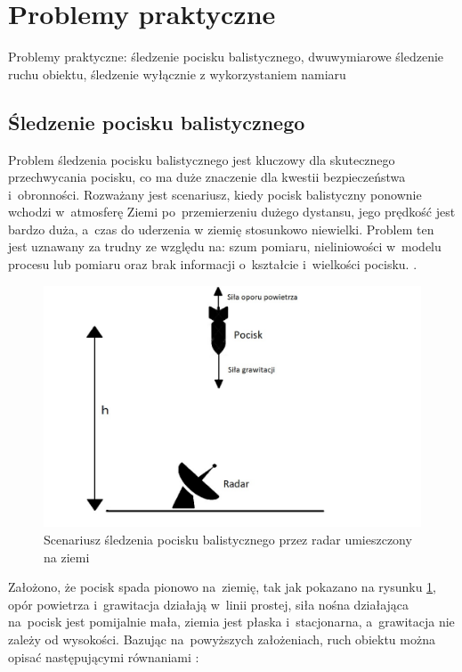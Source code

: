 \section{Problemy praktyczne}
\label{sec:practical_problems}
Problemy praktyczne:  śledzenie pocisku balistycznego, dwuwymiarowe śledzenie ruchu obiektu, śledzenie wyłącznie z wykorzystaniem namiaru 
\subsection{Śledzenie pocisku balistycznego}
\label{subsec:ballistic_target_tracking}
Problem śledzenia pocisku balistycznego jest kluczowy dla skutecznego przechwycania pocisku, co ma duże znaczenie dla kwestii bezpieczeństwa i~obronności. Rozważany jest scenariusz, kiedy pocisk balistyczny ponownie wchodzi w~atmosferę Ziemi po~przemierzeniu dużego dystansu, jego prędkość jest bardzo duża, a~czas do uderzenia w ziemię stosunkowo niewielki. Problem ten jest uznawany za trudny ze względu na: szum pomiaru, nieliniowości w~modelu procesu lub pomiaru oraz brak informacji o~kształcie i~wielkości pocisku. \cite{MisslieTracking1}\cite{MissileTracking2}.
\begin{figure}[h!]
	\centering
	\includegraphics[width=0.8\linewidth]{missile_tracking_illustration.jpg}
	\caption{Scenariusz śledzenia pocisku balistycznego przez radar umieszczony na ziemi}
	\label{fig:missile_tracking_illustration}
\end{figure}
\par
Założono, że pocisk spada pionowo na~ziemię, tak jak pokazano na rysunku \ref{fig:missile_tracking_illustration}, opór powietrza i~grawitacja działają w~linii prostej, siła nośna działająca na~pocisk jest pomijalnie mała, ziemia jest płaska i~stacjonarna, a~grawitacja nie zależy od wysokości. Bazując na~powyższych założeniach, ruch obiektu można opisać następującymi równaniami \cite{MissileTrackingEquations}:
